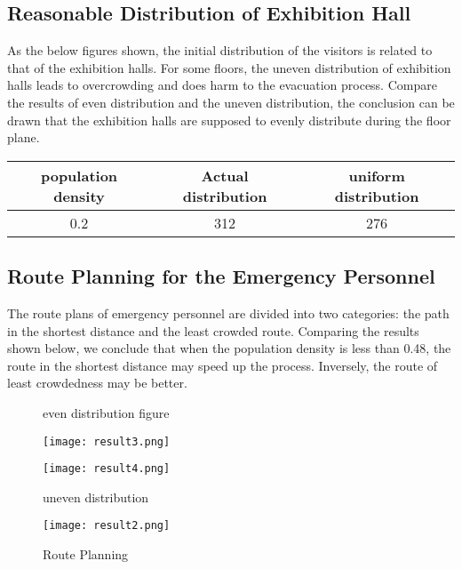\documentclass{mcmthesis}
\begin{document}
\subsection{Reasonable Distribution of Exhibition Hall}
\noindent As the below figures shown, the initial distribution of the visitors is related to that of the exhibition halls. For some floors, the uneven distribution of exhibition halls leads to overcrowding and does harm to the evacuation process.
\indent Compare the results of even distribution and the uneven distribution, the conclusion can be drawn that the exhibition halls are supposed to evenly distribute during the floor plane.
\begin{table}[htbp]
	\centering
	\begin{tabular}{@{}ccc@{}}
		\toprule
		population density & Actual distribution & uniform distribution \\\midrule
		0.2                & 312                 & 276                 \\\bottomrule
	\end{tabular}
\end{table}
\subsection{Route Planning for the Emergency Personnel}
\noindent The route plans of emergency personnel are divided into two categories: the path in the shortest distance and the least crowded route. Comparing the results shown below, we conclude that when the population density is less than 0.48, the route in the shortest distance may speed up the process. Inversely, the route of least crowdedness may be better.
\begin{figure}[htbp]
	\centering
	\begin{minipage}[htbp]{10.0cm}
		\centering
		\caption{even distribution figure}
		\texttt{[image: result3.png]}
	\end{minipage}
	\begin{minipage}[htbp]{10.0cm}
		\centering
		\caption{uneven distribution}
		\texttt{[image: result4.png]}
	\end{minipage}
\end{figure}
\begin{figure}[htbp]
	\caption{Route Planning}
	\centering
	\texttt{[image: result2.png]}
\end{figure}
\end{document}
